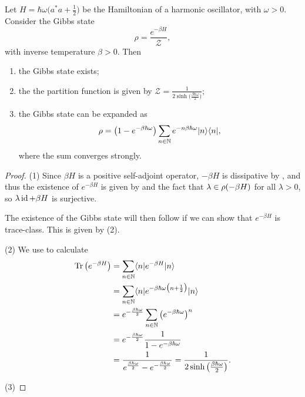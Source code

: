 \begin{proposition}
Let $H = \hbar \omega\big(a^*a + \frac{1}{2}\big)$ be the Hamiltonian of a harmonic oscillator, with $\omega > 0$. Consider the Gibbs state
\[ \rho = \frac{e^{-\beta H}}{\mathcal{Z}}, \]
with inverse temperature $\beta > 0$.
Then
\begin{enumerate}
\item the Gibbs state exists;
\item the the partition function is given by $\mathcal{Z} = \frac{1}{2\sinh\big(\frac{\beta \hbar\omega}{2}\big)}$;
\item the Gibbs state can be expanded as
\[ \rho = \big(1 - e^{-\beta\hbar\omega}\big)\sum_{n\in\mathbb{N}}e^{-n\beta\hbar\omega}|n\rangle\langle n|, \]
where the sum converges strongly.
\end{enumerate}
\end{proposition}
\begin{proof}
(1) Since $\beta H$ is a positive self-adjoint operator, $-\beta H$ is dissipative by , and thus the existence of $e^{-\beta H}$ is given by  and the fact that $\lambda \in \rho(-\beta H)$ for all $\lambda >0$, so $\lambda\operatorname{id} + \beta H$ is surjective.

The existence of the Gibbs state will then follow if we can show that $e^{-\beta H}$ is trace-class. This is given by (2).

(2) We use  to calculate
\begin{align*}
\Tr\big(e^{-\beta H}\big) &= \sum_{n\in\N}\braket[e^{-\beta H}]{n}{n} \\
&= \sum_{n\in\N}\braket[e^{-\beta \hbar \omega\big(n + \frac{1}{2}\big)}]{n}{n} \\
&= e^{- \frac{\beta\hbar\omega}{2}}\sum_{n\in\N}\big(e^{-\beta \hbar \omega}\big)^n \\
&= e^{- \frac{\beta\hbar\omega}{2}}\frac{1}{1 - e^{-\beta \hbar \omega}} \\
&= \frac{1}{e^{\frac{\beta\hbar\omega}{2}} - e^{- \frac{\beta\hbar\omega}{2}}} = \frac{1}{2\sinh\big(\frac{\beta \hbar\omega}{2}\big)}.
\end{align*}

(3) 
\end{proof}